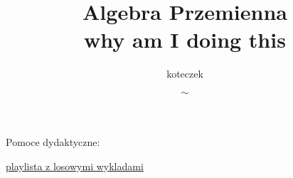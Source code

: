 \documentclass{article}
\title{Algebra Przemienna\smallskip\\{\scriptsize why am I doing this}}
\author{koteczek}
\date{$\sim$}
\begin{document}
\maketit

Pomoce dydaktyczne:

\href{https://www.youtube.com/playlist?list=PL8yHsr3EFj53rSexSz7vsYt-3rpHPR3HB}{playlista z losowymi wykladami}
\end{document}
